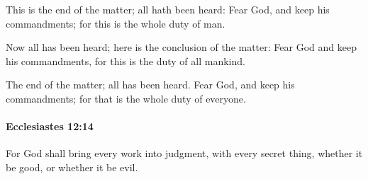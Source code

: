 			\begin{versebox}
					\item[BHS] 
					\item[LXX] 
					\item[ASV] This is the end of the matter; all hath been heard: Fear God, and keep his commandments; for this is the whole duty of man.
					\item[NIV] Now all has been heard; here is the conclusion of the matter: Fear God and keep his commandments, for this is the duty of all mankind.
					\item[NRSV] The end of the matter; all has been heard. Fear God, and keep his commandments; for that is the whole duty of everyone.
			\end{versebox}

		\paragraph{Ecclesiastes 12:14} %
			\label{ECCLESIASTES-12-14}

			For God shall bring every work into judgment, with every secret thing, whether it be good, or whether it be evil.

